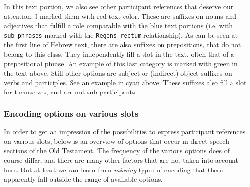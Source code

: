 \documentclass{report}
\newcommand{\mi}[1]{\lstinline{#1}}
\begin{document}
In this text portion, we also see other participant references that deserve our attention. I marked them with red text color. These are suffixes on nouns and adjectives that fulfill a role comparable with the blue text portions (i.e. with \mi{sub_phrases} marked with the \mi{Regens-rectum} relationship). %
As can be seen at the first line of Hebrew text, there are also suffixes on prepositions, that do not belong to this class. They independently fill a slot in the text, often that of a prepositional phrase. An example of this last category is marked with green in the text above. Still other options are subject or (indirect) object suffixes on verbs and participles. See an example in cyan above. These suffixes also fill a slot for themselves, and are not sub-participants.

\subsubsection{Encoding options on various slots}
In order to get an impression of the possibilities to express participant references on various slots, below is an overview of options that occur in direct speech sections of the Old Testament. The frequency of the various options does of course differ, and there are many other factors that are not taken into account here. But at least we can learn from \emph{missing} types of encoding that these apparently fall outside the range of available options.
\end{document}
